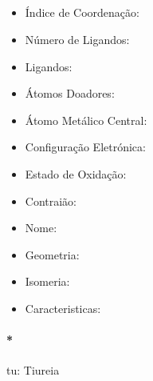 \documentclass[12pt]{article}
\begin{document}
\noindent\begin{minipage}{\textwidth}
	
	\subsection{}
	\begin{itemize}
   
   \item Índice de Coordenação:
   
   \item Número de Ligandos:
   
   \item Ligandos:
   
   \item Átomos Doadores:
   
   \item Átomo Metálico Central:
   
   \item Configuração Eletrónica:
   
   \item Estado de Oxidação:
   
   \item Contraião:
   
   \item Nome:
   
   \item Geometria:
   
   \item Isomeria:

	\item Caracteristicas:

	\end{itemize}
	
\end{minipage}


\paragraph{*}
tu: Tiureia 
\end{document}
